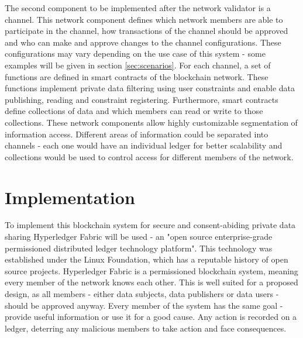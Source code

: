 \documentclass[12pt]{article}
\begin{document}
    
    The second component to be implemented after the network validator is a channel. This network component defines which network members are able to participate in the channel, how transactions of the channel should be approved and who can make and approve changes to the channel configurations. These configurations may vary depending on the use case of this system - some examples will be given in section \ref{sec:scenarios}. For each channel, a set of functions are defined in smart contracts of the blockchain network. These functions implement private data filtering using user constraints and enable data publishing, reading and constraint registering. Furthermore, smart contracts define collections of data and which members can read or write to those collections. These network components allow highly customizable segmentation of information access. Different areas of information could be separated into channels - each one would have an individual ledger for better scalability and collections would be used to control access for different members of the network.


    \section{Implementation}

    To implement this blockchain system for secure and consent-abiding private data sharing Hyperledger Fabric will be used - an "open source enterprise-grade permissioned distributed ledger technology platform"\cite{fabric}. This technology was established under the Linux Foundation, which has a reputable history of open source projects. Hyperledger Fabric is a permissioned blockchain system, meaning every member of the network knows each other. This is well suited for a proposed design, as all members - either data subjects, data publishers or data users - should be approved anyway. Every member of the system has the same goal - provide useful information or use it for a good cause. Any action is recorded on a ledger, deterring any malicious members to take action and face consequences.
\end{document}
